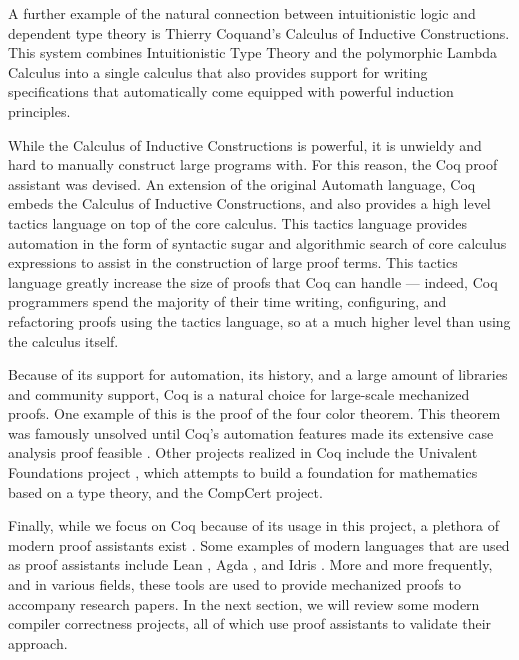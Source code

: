 A further example of the natural connection between intuitionistic logic and dependent type theory is Thierry Coquand's Calculus of Inductive Constructions\cite{coquand_calculus_1986, paulin-mohring_introduction_2015}. This system combines Intuitionistic Type Theory and the polymorphic Lambda Calculus into a single calculus that also provides support for writing specifications that automatically come equipped with powerful induction principles.

While the Calculus of Inductive Constructions is powerful, it is unwieldy and hard to manually construct large programs with. For this reason, the Coq proof assistant \cite{barras_coq_1997} was devised. An extension of the original Automath language, Coq embeds the Calculus of Inductive Constructions, and also provides a high level tactics language \cite{delahaye_tactic_2000} on top of the core calculus. This tactics language provides automation in the form of syntactic sugar and algorithmic search of core calculus expressions to assist in the construction of large proof terms. This tactics language greatly increase the size of proofs that Coq can handle --- indeed, Coq programmers spend the majority of their time writing, configuring, and refactoring proofs using the tactics language, so at a much higher level than using the calculus itself. 

Because of its support for automation, its history, and a large amount of libraries and community support, Coq is a natural choice for large-scale mechanized proofs. One example of this is the proof of the four color theorem. This theorem was famously unsolved until Coq's automation features made its extensive case analysis proof feasible \cite{gonthier_formal_2008}. Other projects realized in Coq include the Univalent Foundations project \cite{voevodsky_univalent_2010}, which attempts to build a foundation for mathematics based on a type theory, and the CompCert project.

Finally, while we focus on Coq because of its usage in this project, a plethora of modern proof assistants exist \cite{geuvers2009proof, barendregt2001proof}. Some examples of modern languages that are used as proof assistants include Lean \cite{de2015lean}, Agda \cite{bove2009brief}, and Idris \cite{brady2013idris}. More and more frequently, and in various fields, these tools are used to provide mechanized proofs to accompany research papers. In the next section, we will review some modern compiler correctness projects, all of which use proof assistants to validate their approach.

